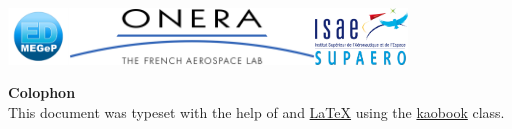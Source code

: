 \documentclass[
	fontsize=11pt, %
	twoside=true, %
	secnumdepth=2, %
	listof=totoc, %
]{kaobook}
\begin{document}
\begin{titlepage}
	\centering
	\includegraphics[height=1.5cm]{figures/01_intro/megep.png}\hfill\includegraphics[height=1.5cm]{figures/01_intro/ONERA_logo.svg.png}\hfill\includegraphics[height=1.5cm]{figures/01_intro/Logo-ISAE-SUPAERO.png}\par
	\vspace{4\baselineskip}
	{\Huge\scshape 
	\@title\par}
	\vspace{4\baselineskip}
	{\LARGE\@author\par}
	\vspace{4\baselineskip}
	{%
	\fontsize{12}{14}\selectfont
	\bfseries\@titlepageauthor
	\par
 	}%
	\medskip
	{%
		\fontsize{11}{12}\selectfont
		\def\and{\\\vspace{13pt}}
		\normalfont\@address
		\par
	}%
	\@date
	\vfill
	{\Large \@titlehead}\par
	\medskip
	\@publishers
\end{titlepage}

\newpage
\vspace*{\fill}
{\large \textbf{Colophon}} \\
This document was typeset with the help of \href{https://sourceforge.net/projects/koma-script/}{\KOMAScript} and \href{https://www.latex-project.org/}{\LaTeX} using the \href{https://github.com/fmarotta/kaobook/}{kaobook} class. \par
\medskip
\@publishers

\makeatother



\end{document}
